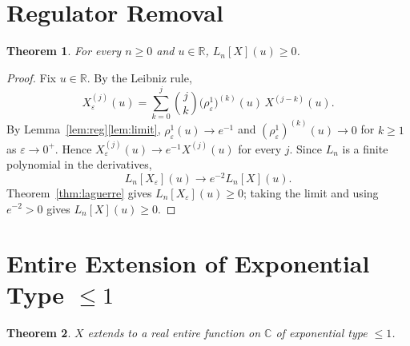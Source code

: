 \documentclass[12pt]{amsart}
\newtheorem{theorem}{Theorem}
\theoremstyle{remark}
\begin{document}
\section{Regulator Removal}\label{sec:removal}

\begin{theorem}\label{thm:removal}
For every $n\geq 0$ and $u\in\mathbb{R}$, $L_n[X](u)\geq 0$.
\end{theorem}

\begin{proof}
Fix $u\in\mathbb{R}$.  By the Leibniz rule,
\[
  X_\varepsilon^{(j)}(u)
  =\sum_{k=0}^{j}\binom{j}{k}\bigl(\rho_\varepsilon^1\bigr)^{(k)}(u)\,
   X^{(j-k)}(u).
\]
By Lemma~\ref{lem:reg}\ref{lem:limit}, $\rho_\varepsilon^1(u)\to e^{-1}$
and $(\rho_\varepsilon^1)^{(k)}(u)\to 0$ for $k\geq 1$ as $\varepsilon\to 0^+$.
Hence $X_\varepsilon^{(j)}(u)\to e^{-1}X^{(j)}(u)$ for every $j$.
Since $L_n$ is a finite polynomial in the derivatives,
\[
  L_n[X_\varepsilon](u)\to e^{-2}L_n[X](u).
\]
Theorem~\ref{thm:laguerre} gives $L_n[X_\varepsilon](u)\geq 0$;
taking the limit and using $e^{-2}>0$ gives $L_n[X](u)\geq 0$.
\end{proof}

\section{Entire Extension of Exponential Type $\leq 1$}
\label{sec:entire}

\begin{theorem}\label{thm:entire}
$X$ extends to a real entire function on $\mathbb{C}$ of exponential
type $\leq 1$.
\end{theorem}
\end{document}
